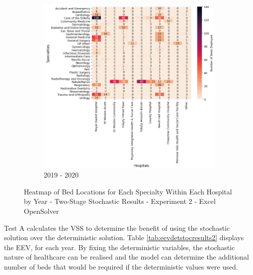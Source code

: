 \documentclass[../thesis.tex]{subfiles}
\begin{document}
\hfill
\begin{figure}\ContinuedFloat
     \begin{subfigure}{0.8\textwidth}
         \centering
         \includegraphics[width=\textwidth]{Chapters/Chapter5/Figures/2019STOC.png}
         \caption{2019 - 2020}
         \label{fig:stocexp2c}
     \end{subfigure}
        \caption{Heatmap of Bed Locations for Each Specialty Within Each Hospital by Year - Two-Stage Stochastic Results - Experiment 2 - Excel OpenSolver}
        \label{fig:stocexp2}
\end{figure}




Test A calculates the VSS to determine the benefit of using the stochastic solution over the deterministic solution. Table \ref{tab:eevdetstocresults2} displays the EEV, for each year. By fixing the deterministic variables, the stochastic nature of healthcare can be realised and the model can determine the additional number of beds that would be required if the deterministic values were used.
\end{document}
